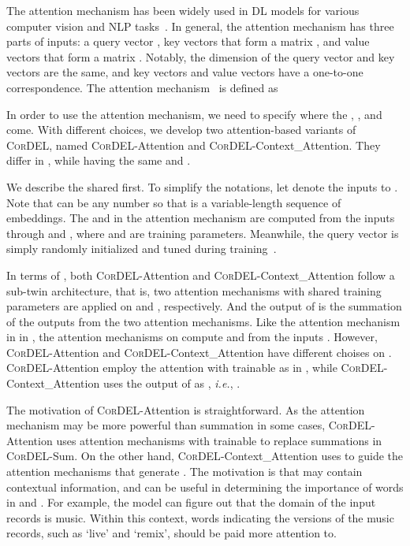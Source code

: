 \documentclass[conference]{IEEEtran}
\begin{document}
The attention mechanism has been widely used in DL models for various computer vision and NLP tasks~\cite{yang2016hierarchical,vaswani2017attention,wang2018non,devlin2019bert,wang2020non,wang2020icapsnets,liu2020global}. In general, the attention mechanism has three parts of inputs: a query vector ,  key vectors that form a matrix , and  value vectors that form a matrix . Notably, the dimension of the query vector and key vectors are the same, and key vectors and value vectors have a one-to-one correspondence. The attention mechanism~\cite{vaswani2017attention} is defined as


In order to use the attention mechanism, we need to specify where the , , and  come. With different choices, we develop two attention-based variants of \textsc{CorDEL}, named \textsc{CorDEL}-Attention and \textsc{CorDEL}-Context\_Attention. They differ in , while having the same  and .

We describe the shared  first. To simplify the notations, let  denote the inputs to . Note that  can be any number so that  is a variable-length sequence of embeddings. The  and  in the attention mechanism are computed from the inputs  through  and , where  and  are training parameters. Meanwhile, the query vector  is simply randomly initialized and tuned during training~\cite{yang2016hierarchical}.

In terms of , both \textsc{CorDEL}-Attention and \textsc{CorDEL}-Context\_Attention follow a sub-twin architecture, that is, two attention mechanisms with shared training parameters are applied on  and , respectively. And the output of  is the summation of the outputs from the two attention mechanisms. Like the attention mechanism in in , the attention mechanisms on  compute  and  from the inputs . However, \textsc{CorDEL}-Attention and \textsc{CorDEL}-Context\_Attention have different choises on . \textsc{CorDEL}-Attention employ the attention with trainable  as in , while \textsc{CorDEL}-Context\_Attention uses the output of  as , \textit{i.e.}, .

The motivation of \textsc{CorDEL}-Attention is straightforward. As the attention mechanism may be more powerful than summation in some cases, \textsc{CorDEL}-Attention uses attention mechanisms with trainable  to replace summations in \textsc{CorDEL}-Sum. On the other hand,  \textsc{CorDEL}-Context\_Attention uses  to guide the attention mechanisms that generate . The motivation is that  may contain contextual information, and can be useful in determining the importance of words in  and . For example, the model can figure out that the domain of the input records is music. Within this context, words indicating the versions of the music records, such as `live' and `remix', should be paid more attention to.
\end{document}
